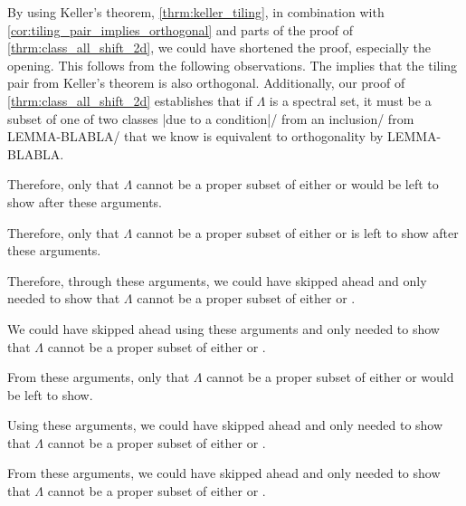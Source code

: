 \documentclass[../thesis.tex]{subfiles}
\begin{document}
\begin{remark}
    By using Keller's theorem, \cref{thrm:keller_tiling}, in combination with \cref{cor:tiling_pair_implies_orthogonal} and parts of the proof of \cref{thrm:class_all_shift_2d}, we could have shortened the proof, especially the opening. This follows from the following observations. The  implies that the tiling pair from Keller's theorem is also orthogonal. Additionally, our proof of \cref{thrm:class_all_shift_2d} establishes that if $\Lambda$ is a spectral set, it must be a subset of one of two classes |due to a condition|/ from an inclusion/ from LEMMA-BLABLA/  that we know is equivalent to orthogonality by LEMMA-BLABLA. 
    

    Therefore, only that $\Lambda$ cannot be a proper subset of either  or  would be left to show after these arguments. 

    Therefore, only that $\Lambda$ cannot be a proper subset of either  or  is left to show after these arguments. 

    Therefore, through these arguments, we could have skipped ahead and only needed to show that $\Lambda$ cannot be a proper subset of either  or .

    We could have skipped ahead using these arguments and only needed to show that $\Lambda$ cannot be a proper subset of either  or .

    From these arguments, only that $\Lambda$ cannot be a proper subset of either  or  would be left to show.

    Using these arguments, we could have skipped ahead and only needed to show that $\Lambda$ cannot be a proper subset of either  or .
    

    From these arguments, we could have skipped ahead and only needed to show that $\Lambda$ cannot be a proper subset of either  or .





\end{remark}
\end{document}
